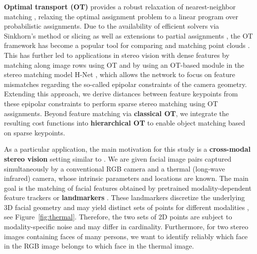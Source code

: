 \documentclass[10pt, twocolumn]{article}
\theoremstyle{definition}
\begin{document}
\textbf{Optimal transport (OT)} provides a robust relaxation of nearest-neighbor matching \cite{COTFNT,Villani2003}, 
relaxing the optimal assignment problem to a linear program over probabilistic assignments.
Due to the availability of efficient solvers {via Sinkhorn's method \cite{Cuturi2013,flamary2021pot,Knight2008} or slicing \cite{BonRabPeyPfi15,KolNadSimBadRoh19,nguyen2025introduction,QueBeiSte23,QueBueSte2024}} as well as extensions to partial assignments \cite{Chapel2020,chizat2018unbalanced,sejourne2023unbalanced}, 
the OT framework has become a popular tool for comparing and matching point clouds \cite{leroy2021pix2point,li2021selfpointflow,puy2020flot,shen2021accurate}.
This has further led to applications in stereo vision with dense features by matching along image rows using OT \cite{frameworkstereoOT} and by using an OT-based module in the stereo matching model H-Net \cite{huang2022h},
which allows the network to focus on feature mismatches regarding the so-called epipolar constraints of the camera geometry. 
Extending this approach, we derive distances between feature keypoints from these epipolar constraints to perform sparse stereo matching using OT assignments.
Beyond feature matching via \textbf{classical OT}, 
we integrate the resulting cost functions into \textbf{hierarchical OT} \cite{alvarezmelis2020geometricdatasetdistancesoptimal, delon2020wassersteintypedistancespacegaussian, 
nguyen2025lightspeed,Schmitzer2013HOT}
to enable object matching based on sparse keypoints.

As a particular application, the main motivation for this study is a \textbf{cross-modal stereo vision} setting similar to \cite{flotho2021multimodal}. We are given facial image pairs captured simultaneously by a conventional RGB camera and a thermal (long-wave infrared) camera, whose intrinsic parameters and locations are known. 
The main goal is the matching of facial features obtained by pretrained modality-dependent feature trackers or \textbf{landmarkers} \cite{bulat2017far,kemelmacher2016megaface,Tang2017,wood2021fake,wu2019facial}.
These landmarkers 
discretize the underlying 3D facial geometry and may yield distinct sets of points for different modalities \cite{deng2019menpo,flotho2025t}, see Figure~\ref{fig:thermal}.
Therefore, the two sets of 2D points are subject to modality-specific noise and may differ in cardinality. 
Furthermore, for two stereo images containing faces of many persons, we want to identify reliably which face in the RGB image belongs to which face in the thermal image.
\end{document}
